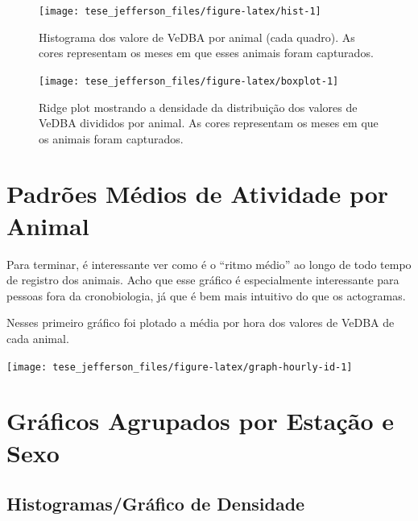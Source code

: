 \documentclass[english,msc,numbers,hidelinks]{coppe}
\begin{document}
  \newpage
  \begin{figure}[H]

  {\centering \texttt{[image: tese\_jefferson\_files/figure-latex/hist-1]} 

  }

  \caption{Histograma dos valore de VeDBA por animal (cada quadro). As cores representam os meses em que esses animais foram capturados.}\label{fig:hist}
  \end{figure}
  \newpage
  \begin{figure}[H]

  {\centering \texttt{[image: tese\_jefferson\_files/figure-latex/boxplot-1]} 

  }

  \caption{Ridge plot mostrando a densidade da distribuição dos valores de VeDBA divididos por animal. As cores representam os meses em que os animais foram capturados.}\label{fig:boxplot}
  \end{figure}
  \newpage

  \hypertarget{padruxf5es-muxe9dios-de-atividade-por-animal}{%
  \section{Padrões Médios de Atividade por Animal}\label{padruxf5es-muxe9dios-de-atividade-por-animal}}

  Para terminar, é interessante ver como é o ``ritmo médio'' ao longo de todo tempo de registro dos animais. Acho que esse gráfico é especialmente interessante para pessoas fora da cronobiologia, já que é bem mais intuitivo do que os actogramas.

  Nesses primeiro gráfico foi plotado a média por hora dos valores de VeDBA de cada animal.
  \begin{center}\texttt{[image: tese\_jefferson\_files/figure-latex/graph-hourly-id-1]} \end{center}

  \newpage

  \hypertarget{gruxe1ficos-agrupados-por-estauxe7uxe3o-e-sexo}{%
  \section{Gráficos Agrupados por Estação e Sexo}\label{gruxe1ficos-agrupados-por-estauxe7uxe3o-e-sexo}}

  \hypertarget{histogramasgruxe1fico-de-densidade}{%
  \subsection{Histogramas/Gráfico de Densidade}\label{histogramasgruxe1fico-de-densidade}}
\end{document}

